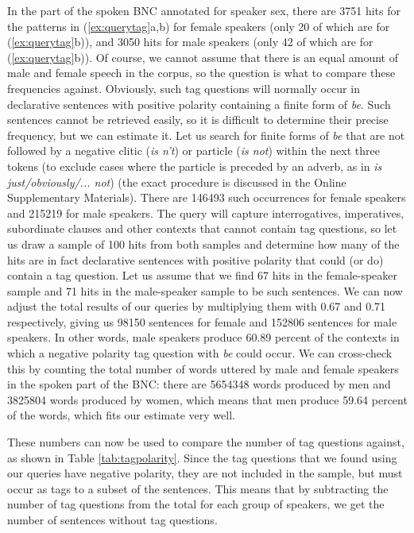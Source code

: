 In the part of the spoken BNC annotated for speaker sex, there are \num{3751} hits for the patterns in (\ref{ex:querytag}a,b) for female speakers (only 20 of which are for  (\ref{ex:querytag}b)), and \num{3050} hits for male speakers (only 42 of which are for (\ref{ex:querytag}b)). Of course, we cannot assume that there is an equal amount of male and female speech in the corpus, so the question is what to compare these frequencies against. Obviously, such tag questions will normally occur in declarative sentences with positive polarity containing a finite form of \textit{be}. Such sentences cannot be retrieved easily, so it is difficult to determine their precise frequency, but we can estimate it. Let us search for finite forms of \textit{be} that are not followed by a negative clitic (\textit{is n't}) or particle (\textit{is not}) within the next three tokens (to exclude cases where the particle is preceded by an adverb, as in \textit{is just/obviously/... not}) (the exact procedure is discussed in the Online Supplementary Materials). There are \num{146493} such occurrences for female speakers and \num{215219} for male speakers. The query will capture interrogatives, imperatives, subordinate clauses and other contexts that cannot contain tag questions, so let us draw a sample of 100 hits from both samples and determine how many of the hits are in fact declarative sentences with positive polarity that could (or do) contain a tag question. Let us assume that we find 67 hits in the female-speaker sample and 71 hits in the male-speaker sample to be such sentences. We can now adjust the total results of our queries by multiplying them with 0.67 and 0.71 respectively, giving us \num{98150} sentences for female and \num{152806} sentences for male speakers. In other words, male speakers produce 60.89 percent of the contexts in which a negative polarity tag question with \textit{be} could occur. We can cross-check this by counting the total number of words uttered by male and female speakers in the spoken part of the BNC: there are \num{5654348} words produced by men and \num{3825804} words produced by women, which means that men produce 59.64 percent of the words, which fits our estimate very well.

These numbers can now be used to compare the number of tag questions against, as shown in Table \ref{tab:tagpolarity}. Since the tag questions that we found using our queries have negative polarity, they are not included in the sample, but must occur as tags to a subset of the sentences. This means that by subtracting the number of tag questions from the total for each group of speakers, we get the number of sentences without tag questions.

